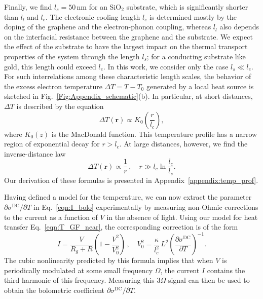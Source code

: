 \documentclass[aps, prb, reprint, superscriptaddress]{revtex4-2}
\renewcommand{\vec}{\mathbf}
\begin{document}
Finally, we find $l_s
= 50\, \mathrm{nm}$ for an SiO$_2$ substrate, which is significantly shorter than $l_l$ and $l_e$.
The electronic cooling length $l_e$ is determined mostly by the doping of the graphene and the electron-phonon coupling, whereas $l_l$ also depends on the interfacial resistance between the graphene and the substrate. 
We expect the effect of the substrate to have the largest impact on the thermal transport properties of the system through the length $l_s$; for a conducting substrate like gold, this length could exceed $l_e$. 
In this work, we consider only the case $l_s\ll l_e$. 
For such interrelations among these characteristic length scales, the behavior of the excess electron temperature $\Delta T = T - T_0$ generated by a local heat source is sketched in Fig.~\ref{Fig:Appendix_schematic}(b). 
In particular, at short distances, $\Delta T$ is described by the equation
\begin{equation}
	\Delta T(\vec{r}) \propto K_0\left(\frac{r}{l_c}\right),
	\label{eqn:T_GF_near}
\end{equation}
where $K_0(z)$ is the MacDonald function.
This temperature profile has a narrow region of exponential decay for $r > l_c$. 
At large distances, however, we find the inverse-distance law
\begin{equation}
	\Delta T(\vec{r}) \propto \frac{1}{r}\,,
	\quad r\gg l_c \ln \frac{l_c}{l_s}.
	\label{eqn:T_GF_far}
\end{equation}
Our derivation of these formulas is presented in Appendix~\ref{appendix:temp_prof}. 

Having defined a model for the temperature, we can now extract the parameter ${\partial\sigma^\mathrm{DC}} / {\partial T}$ in Eq.~\eqref{eqn:I_bolo} experimentally by
measuring non-Ohmic corrections to the current as a function of $V$ in the absence of light. 
Using our model for heat transfer Eq.~\eqref{eqn:T_GF_near}, the corresponding correction is of the form 
\begin{equation}
	\label{eqn:OhmLaw}
	I = \frac{V}{R_g + R} \left(1 - \frac{V^2}{V_0^2} \right)\,,
	\quad V_0^2 = \frac{\kappa}{l_c^2}\, L^2 \left(\frac{\partial\sigma^\mathrm{DC}}{\partial T}\right)^{-1}.
\end{equation}
The cubic nonlinearity predicted by this formula implies that when $V$ is periodically modulated at some small frequency $\Omega$, the current $I$ contains the third harmonic of this frequency.
Measuring this $3\Omega$-signal can then be used to obtain the bolometric coefficient ${\partial\sigma^\mathrm{DC}} / {\partial T}$. 
\end{document}
